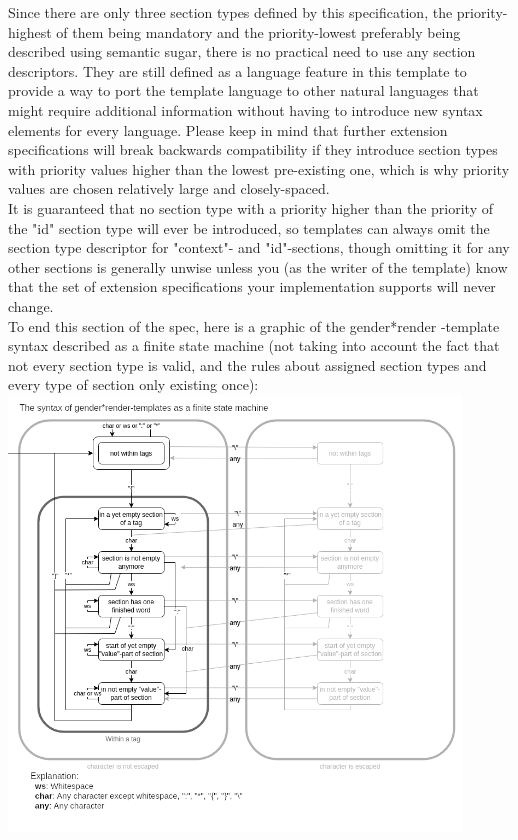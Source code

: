 \documentclass{article}
\newcommand{\GenderRender}{
    gender*render
}
\begin{document}
    Since there are only three section types defined by this specification, the priority-highest of them being mandatory and the priority-lowest preferably being described using semantic sugar, there is no practical need to use any section descriptors.
    They are still defined as a language feature in this template to provide a way to port the template language to other natural languages that might require additional information without having to introduce new syntax elements for every language.
    Please keep in mind that further extension specifications will break backwards compatibility if they introduce section types with priority values higher than the lowest pre-existing one, which is why priority values are chosen relatively large and closely-spaced.\\
    It is guaranteed that no section type with a priority higher than the priority of the "id" section type will ever be introduced, so templates can always omit the section type descriptor for "context"- and "id"-sections, though omitting it for any other sections is generally unwise unless you (as the writer of the template) know that the set of extension specifications your implementation supports will never change.\\

    To end this section of the spec, here is a graphic of the \GenderRender-template syntax described as a finite state machine (not taking into account the fact that not every section type is valid, and the rules about assigned section types and every type of section only existing once):\\

    \includegraphics[width=12cm]{images/template-as-finite-state-machine.png}
\end{document}
